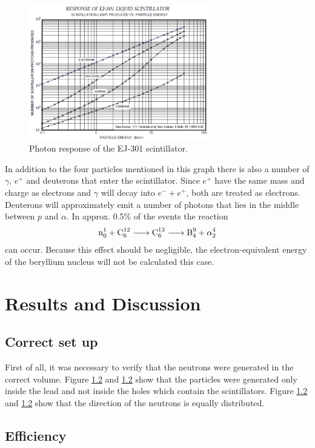 \documentclass[12pt]{article}
\begin{document}
\begin{figure}[htbp]
	\centering
	\includegraphics[width=0.7\textwidth]{./pics/scintillatorResponse.pdf}
	\caption{Photon response of the EJ-301 scintillator.}
	\label{fig:photonResponse}
\end{figure}
In addition to the four particles mentioned in this graph there is also a number of $\gamma$, $e^+$ and deuterons that enter the scintillator. Since $e^+$ have the same mass and charge as electrons and $\gamma$ will decay into $e^- + e^+$, both are treated as electrons. Deuterons will approximately emit a number of photons that lies in the middle between $p$ and $\alpha$. In approx. 0.5\% of the events the reaction 
\begin{align}
	\ce{n^1_0 + C^{12}_6 -> C^{13}_6 -> B^9_4 + \alpha^4_2 } 
\end{align}
can occur. Because this effect should be negligible, the electron-equivalent energy of the beryllium nucleus will not be calculated this case.

\section{Results and Discussion}

\subsection{Correct set up}

First of all, it was necessary to verify that the neutrons were generated in the correct volume. Figure \ref{} and \ref{} show that the particles were generated only inside the lead and not inside the holes which contain the scintillators. Figure \ref{} and \ref{} show that the direction of the neutrons is equally distributed.


\subsection{Efficiency}
\end{document}
